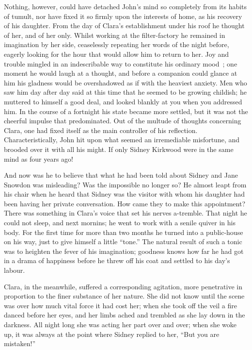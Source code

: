 {\protect\hypertarget{95}{}{}} Nothing, however, could have detached
John's mind so completely from its habits of tumult, nor have fixed it
so firmly upon the interests of home, as his recovery of his daughter.
From the day of Clara's establishment under his roof he thought of her,
and of her only. Whilst working at the filter-factory he remained in
imagination by her side, ceaselessly repeating her words of the night
before, eagerly looking for the hour that would allow him to return to
her. Joy and trouble mingled in an indescribable way to constitute his
ordinary mood~; one moment he would laugh at a thought, and before a
companion could glance at him his gladness would be overshadowed as if
with the heaviest anxiety. Men who saw him day after day said at this
time that he seemed to be growing childish; he muttered to himself a
good deal, and looked blankly at you when you addressed him. In the
course of a fortnight his state became more settled, but it was not the
cheerful impulse that predominated. Out of the multude of thoughts
concerning Clara, one had fixed itself as the main controller of his
reflection. Characteristically, John hit upon
{\protect\hypertarget{96}{}{}} what seemed an irremediable misfortune,
and brooded over it with all his might. If only Sidney Kirkwood were in
the same mind as four years ago!

And now was he to believe that what he had been told about Sidney and
Jane Snowdon was misleading? Was the impossible no longer so? He almost
leapt from his chair when he heard that Sidney was the visitor with whom
his daughter had been having her private conversation. How came they to
make this appointment? There was something in Clara's voice that set his
nerves a-tremble. That night he could not sleep, and next mornins; he
went to work with a senile quiver in his body. For the first time for
more than two months he turned into a public-house on his way, just to
give himself a little ``tone.'' The natural result of such a tonic was
to heighten the fever of his imagination; goodness knows how far he had
got in a drama of happiness before he threw off his coat and settled to
his day's labour.

Clara, in the meanwhile, suffered a corresponding agitation, more
penetrative in proportion to the finer substance of her nature.
{\protect\hypertarget{97}{}{}} She did not know until the scene was over
how much vital force it had cost her; when she took off the veil a fire
danced before her eyes, and her limbs ached and trembled as she lay down
in the darkness. All night long she was acting her part over and over;
when she woke up, it was always at the point where Sidney replied to
her, ``But you are mistaken!''


